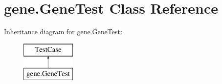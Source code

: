 \hypertarget{classgene_1_1_gene_test}{\section{gene.\+Gene\+Test Class Reference}
\label{classgene_1_1_gene_test}
}
Inheritance diagram for gene.\+Gene\+Test\+:\begin{figure}[H]
\begin{center}
\leavevmode
\includegraphics[height=2.000000cm]{classgene_1_1_gene_test}
\end{center}
\end{figure}

